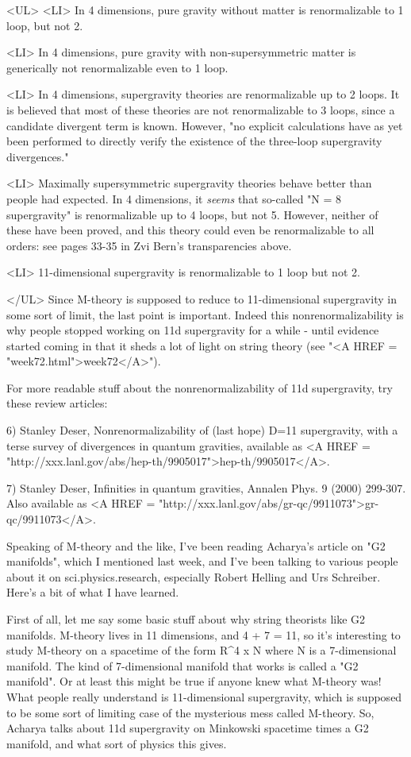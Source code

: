 <UL>
<LI>
In 4 dimensions, pure gravity without matter is renormalizable to 
  1 loop, but not 2.

<LI>
  In 4 dimensions, pure gravity with non-supersymmetric matter is 
  generically not renormalizable even to 1 loop.

<LI>
  In 4 dimensions, supergravity theories are renormalizable up to
  2 loops.  It is believed that most of these theories are not
  renormalizable to 3 loops, since a candidate divergent term is
  known.  However, "no explicit calculations have as yet been 
  performed to directly verify the existence of the three-loop 
  supergravity divergences." 

<LI>
  Maximally supersymmetric supergravity theories behave better
  than people had expected.  In 4 dimensions, it \emph{seems} that
  so-called "N = 8 supergravity" is renormalizable up to 4 loops,
  but not 5.  However, neither of these have been proved, and 
  this theory could even be renormalizable to all orders: 
  see pages 33-35 in Zvi Bern's transparencies above.

<LI>
  11-dimensional supergravity is renormalizable to 1 loop but not 2.

</UL>
Since M-theory is supposed to reduce to 11-dimensional supergravity in
some sort of limit, the last point is important.  Indeed this
nonrenormalizability is why people stopped working on 11d supergravity
for a while - until evidence started coming in that it sheds a lot of
light on string theory (see "<A HREF =
"week72.html">week72</A>").

For more readable stuff about the nonrenormalizability of 11d
supergravity, try these review articles:


6) Stanley Deser, Nonrenormalizability of (last hope) D=11
supergravity, with a terse survey of divergences in quantum gravities,
available as <A HREF =
"http://xxx.lanl.gov/abs/hep-th/9905017">hep-th/9905017</A>.
 

7) Stanley Deser, Infinities in quantum gravities, Annalen Phys.  9
(2000) 299-307.  Also available as <A HREF =
"http://xxx.lanl.gov/abs/gr-qc/9911073">gr-qc/9911073</A>.

Speaking of M-theory and the like, I've been reading Acharya's 
article on "G2 manifolds", which I mentioned last week, and I've 
been talking to various people about it on sci.physics.research, 
especially Robert Helling and Urs Schreiber.  Here's a bit of what 
I have learned.   

First of all, let me say some basic stuff about why string theorists
like G2 manifolds.  M-theory lives in 11 dimensions, and 4 + 7 = 11,
so it's interesting to study M-theory on a spacetime of the form
R^{4} x N where N is a 7-dimensional manifold.  The kind of
7-dimensional manifold that works is called a "G2 manifold".
Or at least this might be true if anyone knew what M-theory was!  What
people really understand is 11-dimensional supergravity, which is
supposed to be some sort of limiting case of the mysterious mess
called M-theory.  So, Acharya talks about 11d supergravity on
Minkowski spacetime times a G2 manifold, and what sort of physics this
gives.

